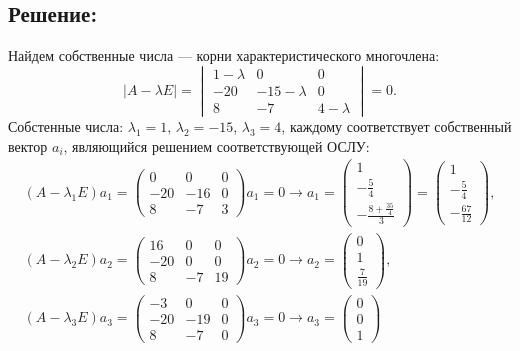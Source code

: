 \documentclass[12pt]{article}
\begin{document}
    \subsection*{Решение:}
    Найдем собственные числа --- корни характеристического многочлена:
    \[
        \left | A - \lambda E \right |
        = \begin{vmatrix}
              1 - \lambda & 0 & 0 \\
              -20 & -15 - \lambda & 0 \\
              8 & -7 & 4 - \lambda
        \end{vmatrix}
        = 0 .
    \]
    Собстенные числа: $\lambda_1 = 1$, $\lambda_2 = -15$, $\lambda_3 = 4$, каждому соответствует собственный вектор $a_i$, являющийся решением
    соответствующей ОСЛУ:
    \begin{gather*}
        \left ( A - \lambda_1 E \right ) a_1
        = \begin{pmatrix}
              0 & 0 & 0 \\
              -20 & -16 & 0 \\
              8 & -7 & 3
        \end{pmatrix}
        a_1 = 0
        \rightarrow
        a_1
        = \begin{pmatrix}
              1 \\ - \frac{5}{4} \\ - \frac{8 + \frac{35}{4}}{3}
        \end{pmatrix}
        = \begin{pmatrix}
              1 \\ - \frac{5}{4} \\ - \frac{67}{12}
        \end{pmatrix} , \\
        \left ( A - \lambda_2 E \right ) a_2
        = \begin{pmatrix}
              16 & 0 & 0 \\
              -20 & 0 & 0 \\
              8 & -7 & 19
        \end{pmatrix}
        a_2 = 0
        \rightarrow
        a_2
        = \begin{pmatrix}
              0 \\ 1 \\ \frac{7}{19}
        \end{pmatrix} , \\
        \left ( A - \lambda_3 E \right ) a_3
        = \begin{pmatrix}
              -3 & 0 & 0 \\
              -20 & -19 & 0 \\
              8 & -7 & 0
        \end{pmatrix}
        a_3 = 0
        \rightarrow
        a_3
        = \begin{pmatrix}
              0 \\ 0 \\ 1
        \end{pmatrix}
    \end{gather*}
\end{document}
